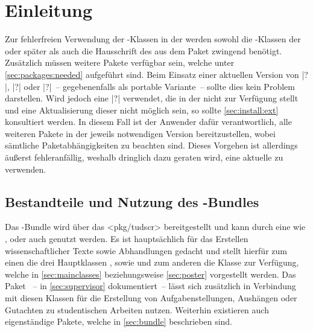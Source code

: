 \chapter{Einleitung}

Zur fehlerfreien Verwendung der \TUDScript-Klassen in der  
werden sowohl die \KOMAScript-Klassen der  oder später 
als auch die Hausschrift des \CDs \OpenSans aus dem Paket  
zwingend benötigt. Zusätzlich müssen weitere Pakete verfügbar sein, welche 
unter \autoref{sec:packages:needed} aufgeführt sind. Beim Einsatz einer 
aktuellen Version von \TeXLive|?|, \MacTeX|?| oder \MiKTeX|?|~-- gegebenenfalls 
als portable Variante~-- sollte dies kein Problem darstellen. Wird jedoch eine 
\Distro|?| verwendet, die \TUDScript in der  nicht zur 
Verfügung stellt und eine Aktualisierung dieser nicht möglich sein, so sollte 
\autoref{sec:install:ext} konsultiert werden. In diesem Fall ist der Anwender 
dafür verantwortlich, alle weiteren Pakete in der jeweils notwendigen Version 
bereitzustellen, wobei sämtliche Paketabhängigkeiten zu beachten sind. Dieses 
Vorgehen ist allerdings äußerst fehleranfällig, weshalb dringlich dazu geraten 
wird, eine aktuelle \Distro zu verwenden.



\section{Bestandteile und Nutzung des \TUDScript-Bundles}

%
%
Das \TUDScript-Bundle wird über das \CTAN<pkg/tudscr> bereitgestellt und kann 
durch eine \Distro wie \TeXLive, \MacTeX oder auch \MiKTeX genutzt werden. Es 
ist hauptsächlich für das Erstellen wissenschaftlicher Texte sowie Abhandlungen 
gedacht und stellt hierfür zum einen die drei Hauptklassen , 
 sowie  und zum anderen die Klasse 
 zur Verfügung, welche in \autoref{sec:mainclasses} 
beziehungsweise \autoref{sec:poster} vorgestellt werden. Das Paket 
~-- in \autoref{sec:supervisor} dokumentiert~-- lässt 
sich zusätzlich in Verbindung mit diesen Klassen für die Erstellung von 
Aufgabenstellungen, Aushängen oder Gutachten zu studentischen Arbeiten nutzen. 
Weiterhin existieren auch eigenständige Pakete, welche in \autoref{sec:bundle} 
beschrieben sind. 

